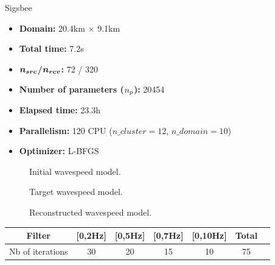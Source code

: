 
\begin{frame}{Sigsbee}

  \vspace{-0.6cm}
   \begin{multicols}{2}

     \begin{itemize}
       \scriptsize
    \item \textbf{Domain:} 20.4km $\times$ 9.1km
    \item \textbf{Total time:} 7.2s
    \item \textbf{$\boldsymbol{{n_{src}}}$/$\boldsymbol{{n_{rcv}}}$:} 72 / 320
    \item \textbf{Number of parameters (${n_{p}}$):} 20454
    \item \textbf{Elapsed time:} 23.3h
    \item \textbf{Parallelism:} 120 CPU ($n\_cluster=12$, $n\_domain=10$)
    \item \textbf{Optimizer:} L-BFGS
     \end{itemize}

     \columnbreak
     \scriptsize
     \setlength{\modelwidth}{6.0cm}
     \begin{figure}
       \renewcommand{\modelfile}{image/sigsbee_ini}
       
       \vspace{-0.3cm}
       \caption*{\scriptsize{Initial wavespeed model.}}
       \label{marmousi_blind_c4}
     \end{figure}
     \vspace{-1.2cm}
     \begin{figure}
       \renewcommand{\modelfile}{image/sigsbee}
       
       \vspace{-0.3cm}
       \caption*{\scriptsize{Target wavespeed model.}}
       \label{marmousi_blind_c4}
     \end{figure}
     \vspace{-1.2cm}
          \begin{figure}
       \renewcommand{\modelfile}{image/sigsbee_final}
       
       \vspace{-0.3cm}
       \caption*{\scriptsize{Reconstructed wavespeed model.}}
       \label{marmousi_blind_c4}
     \end{figure}

   \end{multicols}

   \vspace{-1cm}
   \scriptsize
\begin{table}[H]
  \centering
\begin{tabular}{|c|c|c|c|c|c|c|}
\hline
Filter           & {[}0,2Hz{]} & {[}0,5Hz{]} & {[}0,7Hz{]} & {[}0,10Hz{]}  & Total \\ \hline
Nb of iterations & 30          & 20          & 15            & 10          & 75    \\ \hline
\end{tabular}
\end{table}
\end{frame}
